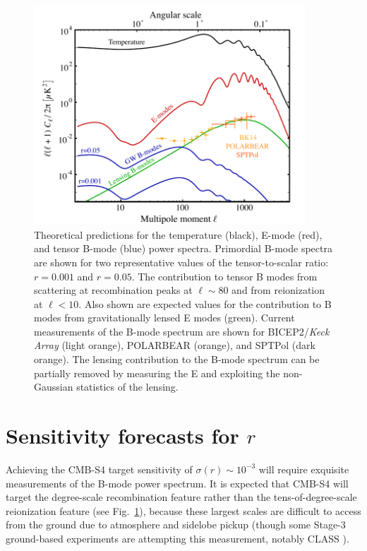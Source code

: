 \begin{figure}[h]
\begin{center}
\includegraphics[width=4in]{Inflation/cmb_powspec_v4.pdf}
\end{center}
\caption{Theoretical predictions for the temperature (black), 
E-mode (red), and tensor B-mode (blue) power spectra. Primordial 
B-mode spectra are shown for two representative values of the tensor-to-scalar
ratio: $r=0.001$ and $r=0.05.$ 
The contribution to tensor B modes from scattering at recombination peaks at $\ell \sim 80$
and from reionization at $\ell < 10$.
Also shown are expected values for the contribution to B modes from gravitationally lensed E modes (green).
Current measurements of the B-mode spectrum are shown for {BICEP}2/{\em Keck Array} (light orange), POLARBEAR (orange), and SPTPol (dark orange). 
The lensing contribution to the B-mode spectrum can be partially removed by measuring the 
E and exploiting the non-Gaussian statistics of the lensing.
}
\label{fig:clall}
\end{figure}

\section{Sensitivity forecasts for $r$}
\label{sec:needs}

Achieving the CMB-S4 target sensitivity of $\sigma(r) \sim 10^{-3}$ will require exquisite measurements of the B-mode power spectrum. 
It is expected that CMB-S4 will target the degree-scale recombination feature rather than the tens-of-degree-scale reionization feature (see Fig.~\ref{fig:clall}), because these largest scales are difficult to access from the ground due to atmosphere and sidelobe pickup (though some Stage-3 ground-based experiments are attempting this measurement, notably CLASS \cite{Essinger-Hileman:2014pja}).

